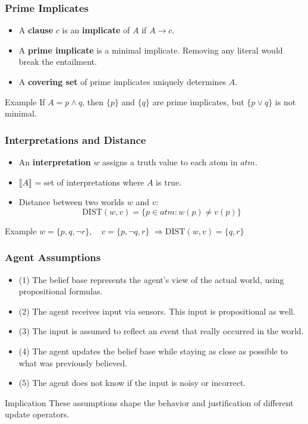 \documentclass{beamer}
\begin{document}
\begin{frame}
\frametitle{Prime Implicates}
\begin{itemize}
    \item A \textbf{clause} $c$ is an \textbf{implicate} of $A$ if $A \rightarrow c$.
    \item A \textbf{prime implicate} is a minimal implicate. Removing any literal would break the entailment.
    \item A \textbf{covering set} of prime implicates uniquely determines $A$.
\end{itemize}
\pause
\begin{block}{Example}
If $A = p \wedge q$, then $\{p\}$ and $\{q\}$ are prime implicates, but $\{p \vee q\}$ is not minimal.
\end{block}
\end{frame}

\begin{frame}
\frametitle{Interpretations and Distance}
\begin{itemize}
    \item An \textbf{interpretation} $w$ assigns a truth value to each atom in $\mathit{atm}$.
    \item $\llbracket A \rrbracket$ = set of interpretations where $A$ is true.
    \item Distance between two worlds $w$ and $v$:
    \[
        \text{DIST}(w, v) = \{p \in \mathit{atm} : w(p) \ne v(p)\}
    \]
\end{itemize}
\pause
\begin{block}{Example}
$w = \{p, q, \neg r\}, \quad v = \{p, \neg q, r\}$  
$\Rightarrow \text{DIST}(w, v) = \{q, r\}$
\end{block}
\end{frame}


\begin{frame}
\frametitle{Agent Assumptions}
\begin{itemize}
    \item (1) The belief base represents the agent's view of the actual world, using propositional formulas.
    \item (2) The agent receives input via sensors. This input is propositional as well.
    \item (3) The input is assumed to reflect an event that really occurred in the world.
    \item (4) The agent updates the belief base while staying as close as possible to what was previously believed.
    \item (5) The agent does not know if the input is noisy or incorrect.
\end{itemize}
\pause
\begin{block}{Implication}
These assumptions shape the behavior and justification of different update operators.
\end{block}
\end{frame}
\end{document}
